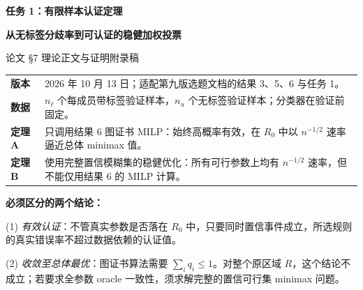 \documentclass[11pt,a4paper]{ctexart}
\theoremstyle{definition}
\begin{document}
\thispagestyle{empty}
\vspace*{1.1cm}
\noindent{\color{teal}\rule{\textwidth}{1.7pt}}\par
\vspace{.6cm}
{\Huge\bfseries 任务 1：有限样本认证定理}\par
\vspace{.24cm}
{\LARGE\bfseries 从无标签分歧率到可认证的稳健加权投票}\par
\vspace{.6cm}
{\Large 论文 \S7 理论正文与证明附录稿}\par
\vspace{.7cm}
\noindent\begin{tabularx}{\textwidth}{@{}p{27mm}X@{}}
\textbf{版本} & 2026 年 10 月 13 日；适配第九版选题文档的结果 3、5、6 与任务 1。\\
\textbf{数据} & $n_\ell$ 个每成员带标签验证样本，$n_u$ 个无标签验证样本；分类器在验证前固定。\\
\textbf{定理 A} & 只调用结果 6 图证书 MILP：始终高概率有效，在 $R_0$ 中以 $n^{-1/2}$ 速率逼近总体 minimax 值。\\
\textbf{定理 B} & 使用完整置信模糊集的稳健优化：所有可行参数上均有 $n^{-1/2}$ 速率，但不能仅用结果 6 的 MILP 计算。\\
\end{tabularx}
\vfill
\begin{keybox}
\textbf{必须区分的两个结论：}\par
(1) \emph{有效认证}：不管真实参数是否落在 $R_0$ 中，只要同时置信事件成立，所选规则的真实错误率不超过数据依赖的认证值。\par
(2) \emph{收敛至总体最优}：图证书算法需要 $\sum_iq_i\le1$。对整个原区域 $R$，这个结论不成立；若要求全参数 oracle 一致性，须求解完整的置信可行集 minimax 问题。
\end{keybox}
\vspace{.6cm}
\newpage
\tableofcontents
\newpage
\end{document}
